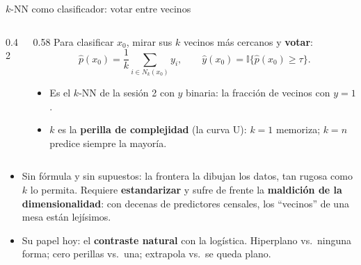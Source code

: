 \documentclass{beamer}
\newcommand{\1}{\mathbb{I}}
\begin{document}
\begin{frame}{$k$-NN como clasificador: votar entre vecinos}
\small
\begin{columns}[T]
\begin{column}{0.42\textwidth}
\begin{center}
\end{center}
\end{column}
\begin{column}{0.58\textwidth}
\vspace{0.05cm}
Para clasificar $x_0$, mirar sus $k$ vecinos más cercanos y \textbf{votar}:
\[ \hat{p}(x_0) = \frac{1}{k} \sum_{i \in N_k(x_0)} y_i, \qquad \hat{y}(x_0) = \1\{\hat{p}(x_0) \geq \tau\}. \]
\begin{itemize}\itemsep3pt
  \item Es el $k$-NN de la sesión 2 con $y$ binaria: la fracción de vecinos con $y = 1$.
  \item $k$ es la \textbf{perilla de complejidad} (la curva U): $k = 1$ memoriza; $k = n$ predice siempre la mayoría.
\end{itemize}
\end{column}
\end{columns}
\pause
\vspace{0.05cm}
\begin{itemize}\itemsep3pt
  \item Sin fórmula y sin supuestos: la frontera la dibujan los datos, tan rugosa como $k$ lo permita. Requiere \textbf{estandarizar} y sufre de frente la \textbf{maldición de la dimensionalidad}: con decenas de predictores censales, los ``vecinos'' de una mesa están lejísimos.
  \item Su papel hoy: el \textbf{contraste natural} con la logística. Hiperplano vs.\ ninguna forma; cero perillas vs.\ una; extrapola vs.\ se queda plano.
\end{itemize}
\end{frame}
\end{document}
